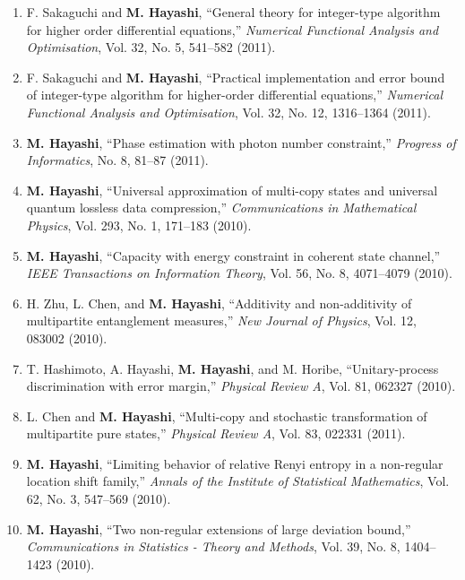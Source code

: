 \documentclass[a4paper,12pt,oneside]{article}
\begin{document}
\begin{enumerate}
\item   F. Sakaguchi and \textbf{M. Hayashi}, 
``General theory for integer-type algorithm for higher order differential equations,'' 
{\em Numerical Functional Analysis and Optimisation}, 
Vol. 32, No. 5, 541--582 (2011).

\item   
F. Sakaguchi and \textbf{M. Hayashi}, 
``Practical implementation and error bound of integer-type algorithm for higher-order differential equations,'' 
{\em Numerical Functional Analysis and Optimisation}, 
Vol. 32, No. 12, 1316--1364 (2011). 

\item   \textbf{M. Hayashi}, 
``Phase estimation with photon number constraint,'' 
{\em Progress of Informatics}, No. 8, 81--87 (2011).

\item   \textbf{M. Hayashi}, 
``Universal approximation of multi-copy states and universal quantum lossless data compression,'' 
{\em Communications in Mathematical Physics}, Vol. 293, No. 1, 171--183 (2010). 

\item   \textbf{M. Hayashi}, 
``Capacity with energy constraint in coherent state channel,'' 
{\em IEEE Transactions on Information Theory}, Vol. 56, No. 8, 4071--4079 (2010).

\item   H. Zhu, L. Chen, and \textbf{M. Hayashi}, 
``Additivity and non-additivity of multipartite entanglement measures,'' 
{\em New Journal of Physics}, Vol. 12, 083002 (2010). 

\item   T. Hashimoto, A. Hayashi, \textbf{M. Hayashi}, and M. Horibe, 
``Unitary-process discrimination with error margin,'' 
{\em Physical Review A}, Vol. 81, 062327 (2010).

\item   L. Chen and \textbf{M. Hayashi}, 
``Multi-copy and stochastic transformation of multipartite pure states,'' 
{\em Physical Review A}, Vol. 83, 022331 (2011).

\item   \textbf{M. Hayashi}, 
``Limiting behavior of relative Renyi entropy in a non-regular location shift family,'' 
{\em Annals of the Institute of Statistical Mathematics}, Vol. 62, No. 3, 547--569 (2010).

\item   \textbf{M. Hayashi}, 
``Two non-regular extensions of large deviation bound,'' 
{\em Communications in Statistics - Theory and Methods}, 
Vol. 39, No. 8, 1404--1423 (2010). 


\end{enumerate}
\end{document}
